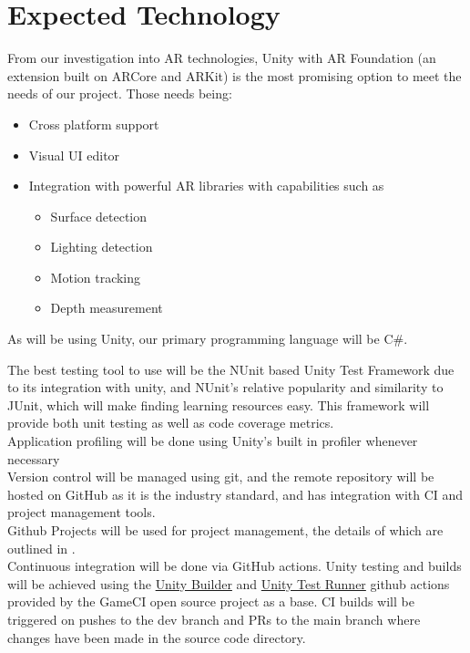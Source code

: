 \documentclass{article}
\begin{document}
\section{Expected Technology}

From our investigation into AR technologies, Unity with AR Foundation (an extension built on ARCore and ARKit) is the most promising option to meet the needs of our project. Those needs being:
\begin{itemize}
  \item Cross platform support
  \item Visual UI editor
  \item Integration with powerful AR libraries with capabilities such as
  \begin{itemize}
        \item Surface detection
        \item Lighting detection
        \item Motion tracking
        \item Depth measurement
      \end{itemize}
\end{itemize}


As will be using Unity, our primary programming language will be C\#.\\

\pagebreak

The best testing tool to use will be the NUnit based Unity Test Framework due to its integration with unity, 
and NUnit's relative popularity and similarity to JUnit, 
which will make finding learning resources easy. 
This framework will provide both unit testing as well as code coverage metrics.\\

Application profiling will be done using Unity's built in profiler whenever necessary\\

Version control will be managed using git, 
and the remote repository will be hosted on GitHub as it is the industry standard, 
and has integration with CI and project management tools.\\

Github Projects will be used for project management, 
the details of which are outlined in .\\

Continuous integration will be done via GitHub actions. 
Unity testing and builds will be achieved using the 
\href{https://github.com/marketplace/actions/unity-builder}{Unity Builder} 
and \href{https://github.com/marketplace/actions/unity-test-runner}{Unity Test Runner} 
github actions provided by the GameCI open source project as a base. 
CI builds will be triggered on pushes to the dev branch and PRs to the main branch 
where changes have been made in the source code directory.\\
\end{document}
